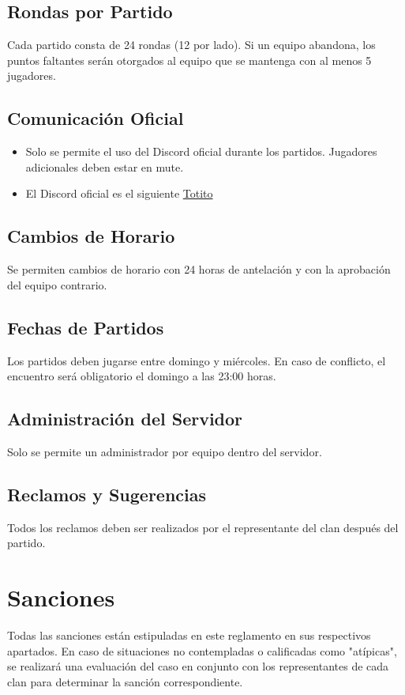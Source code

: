 \documentclass[a4paper, 11pt]{article}
\begin{document}
    \subsection{Rondas por Partido}
    Cada partido consta de 24 rondas (12 por lado). Si un equipo abandona, los puntos faltantes serán otorgados al equipo que se mantenga con al menos 5 jugadores.

    \subsection{Comunicación Oficial}
    \begin{itemize}
        \item Solo se permite el uso del Discord oficial durante los partidos. Jugadores adicionales deben estar en mute.
        \item El Discord oficial es el siguiente \hyperlink{https://discord.gg/ajQxVbh8}{Totito}
    \end{itemize}

    \subsection{Cambios de Horario}
    Se permiten cambios de horario con 24 horas de antelación y con la aprobación del equipo contrario.

    \subsection{Fechas de Partidos}
    Los partidos deben jugarse entre domingo y miércoles. En caso de conflicto, el encuentro será obligatorio el domingo a las 23:00 horas.

    \subsection{Administración del Servidor}
    Solo se permite un administrador por equipo dentro del servidor.

    \subsection{Reclamos y Sugerencias}

    Todos los reclamos deben ser realizados por el representante del clan después del partido.

    \clearpage

    \section{Sanciones}
    Todas las sanciones están estipuladas en este reglamento en sus respectivos apartados. En caso de situaciones no contempladas o calificadas como "atípicas", se realizará una evaluación del caso en conjunto con los representantes de cada clan para determinar la sanción correspondiente.
\end{document}
